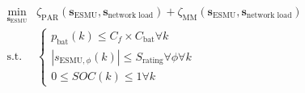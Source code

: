\begin{equation}
\begin{split}
	\min_{\textbf{s}_\text{ESMU}} & \zeta_\text{PAR}(\textbf{s}_\text{ESMU}, \textbf{s}_\text{network load}) + \zeta_\text{MM}(\textbf{s}_\text{ESMU}, \textbf{s}_\text{network load})\\
	\text{s.t. }& \begin{cases}
		p_\text{bat}(k) \leq C_f\times C_\text{bat} \forall k\\
		\left|s_{\text{ESMU},\phi}(k)\right| \leq S_\text{rating} \forall \phi \forall k\\
		0 \leq SOC(k) \leq 1 \forall k
	\end{cases}
\end{split}
\label{ch1:equ:scheduling-cost}
\end{equation}